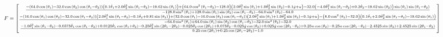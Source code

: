 \begin{equation}
F = \left[\begin{matrix}\frac{- \left(64.0 \cos{\left(\theta_{1} \right)} - 32.0 \cos{\left(\theta_{2} \right)} \cos{\left(\theta_{1} - \theta_{2} \right)}\right) \left(0.1 \dot\theta_{1} + 2.0 \dot\theta_{2}^{2} \sin{\left(\theta_{1} - \theta_{2} \right)} - 19.62 \sin{\left(\theta_{1} \right)}\right) + \left(64.0 \cos^{2}{\left(\theta_{1} - \theta_{2} \right)} - 128.0\right) \left(2.0 \dot\theta_{1}^{2} \sin{\left(\theta_{1} \right)} + 1.0 \dot\theta_{2}^{2} \sin{\left(\theta_{2} \right)} - 0.1 \dot y + u\right) - 32.0 \left(- 4.0 \dot\theta_{1}^{2} \sin{\left(\theta_{1} - \theta_{2} \right)} + 0.2 \dot\theta_{2} - 19.62 \sin{\left(\theta_{2} \right)}\right) \sin{\left(\theta_{1} \right)} \sin{\left(\theta_{1} - \theta_{2} \right)}}{- 128.0 \sin^{2}{\left(\theta_{1} \right)} + 128.0 \sin{\left(\theta_{1} \right)} \sin{\left(\theta_{2} \right)} \cos{\left(\theta_{1} - \theta_{2} \right)} - 64.0 \sin^{2}{\left(\theta_{2} \right)} - 64.0}\\
\frac{- \left(16.0 \cos{\left(\theta_{1} \right)} \cos{\left(\theta_{2} \right)} - 32.0 \cos{\left(\theta_{1} - \theta_{2} \right)}\right) \left(2.0 \dot\theta_{1}^{2} \sin{\left(\theta_{1} - \theta_{2} \right)} - 0.1 \dot\theta_{2} + 9.81 \sin{\left(\theta_{2} \right)}\right) + \left(32.0 \cos{\left(\theta_{1} \right)} - 16.0 \cos{\left(\theta_{2} \right)} \cos{\left(\theta_{1} - \theta_{2} \right)}\right) \left(2.0 \dot\theta_{1}^{2} \sin{\left(\theta_{1} \right)} + 1.0 \dot\theta_{2}^{2} \sin{\left(\theta_{2} \right)} - 0.1 \dot y + u\right) - \left(8.0 \cos^{2}{\left(\theta_{2} \right)} - 32.0\right) \left(0.1 \dot\theta_{1} + 2.0 \dot\theta_{2}^{2} \sin{\left(\theta_{1} - \theta_{2} \right)} - 19.62 \sin{\left(\theta_{1} \right)}\right)}{- 64.0 \sin^{2}{\left(\theta_{1} \right)} + 64.0 \sin{\left(\theta_{1} \right)} \sin{\left(\theta_{2} \right)} \cos{\left(\theta_{1} - \theta_{2} \right)} - 32.0 \sin^{2}{\left(\theta_{2} \right)} - 32.0}\\
\frac{- 1.0 \dot\theta_{1}^{2} \sin{\left(\theta_{1} - \theta_{2} \right)} - 0.0375 \dot\theta_{1} \cos{\left(\theta_{1} - \theta_{2} \right)} + 0.0125 \dot\theta_{1} \cos{\left(\theta_{1} + \theta_{2} \right)} - 0.25 \dot\theta_{2}^{2} \sin{\left(2 \theta_{1} - 2 \theta_{2} \right)} - 0.025 \dot\theta_{2} \cos{\left(2 \theta_{1} \right)} + 0.075 \dot\theta_{2} - 0.025 \dot y \cos{\left(\theta_{2} \right)} + 0.025 \dot y \cos{\left(2 \theta_{1} - \theta_{2} \right)} + 0.25 u \cos{\left(\theta_{2} \right)} - 0.25 u \cos{\left(2 \theta_{1} - \theta_{2} \right)} - 2.4525 \sin{\left(\theta_{2} \right)} + 2.4525 \sin{\left(2 \theta_{1} - \theta_{2} \right)}}{0.25 \cos{\left(2 \theta_{1} \right)} + 0.25 \cos{\left(2 \theta_{1} - 2 \theta_{2} \right)} - 1.0}\end{matrix}\right]
\end{equation}
